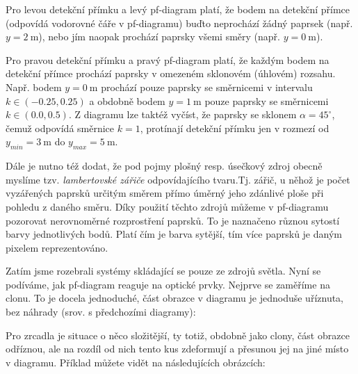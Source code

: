 
Pro levou detekční přímku a levý pf-diagram platí, že bodem na detekční přímce (odpovídá vodorovné čáře v pf-diagramu) buďto neprochází žádný paprsek (např. $y = 2\ \mathrm{m}$), nebo jím naopak prochází paprsky všemi směry (např. $y = 0\ \mathrm{m}$).

Pro pravou detekční přímku a pravý pf-diagram platí, že každým bodem na detekční přímce prochází paprsky v omezeném sklonovém (úhlovém) rozsahu. Např. bodem $y = 0\ \mathrm{m}$ prochází pouze paprsky se směrnicemi v intervalu $k \in (-0.25, 0.25)$ a obdobně bodem $y = 1\ \mathrm{m}$ pouze paprsky se směrnicemi $k \in (0.0, 0.5)$. Z diagramu lze taktéž vyčíst, že paprsky se sklonem $\alpha = 45^{\circ}$, čemuž odpovídá směrnice $k = 1$, protínají detekční přímku jen v rozmezí od $y_{min} = 3\ \mathrm{m}$ do $y_{max} = 5\ \mathrm{m}$.

Dále je nutno též dodat, že pod pojmy plošný resp. úsečkový zdroj obecně myslíme tzv. \emph{lambertovské zářiče} odpovídajícího tvaru.\src Tj. zářič, u něhož je počet vyzářených paprsků určitým směrem přímo úměrný jeho zdánlivé ploše při pohledu z daného směru. Díky použití těchto zdrojů můžeme v pf-diagramu pozorovat nerovnoměrné rozprostření paprsků. To je naznačeno různou sytostí barvy jednotlivých bodů. Platí čím je barva sytější, tím více paprsků je daným pixelem reprezentováno.

Zatím jsme rozebrali systémy skládající se pouze ze zdrojů světla. Nyní se podíváme, jak pf-diagram reaguje na optické prvky. Nejprve se zaměříme na clonu. To je docela jednoduché, část obrazce v diagramu je jednoduše uříznuta, bez náhrady (srov. s předchozími diagramy):


Pro zrcadla je situace o něco složitější, ty totiž, obdobně jako clony, část obrazce odříznou, ale na rozdíl od nich tento kus zdeformují a přesunou jej na jiné místo v diagramu. Příklad můžete vidět na následujících obrázcích:

